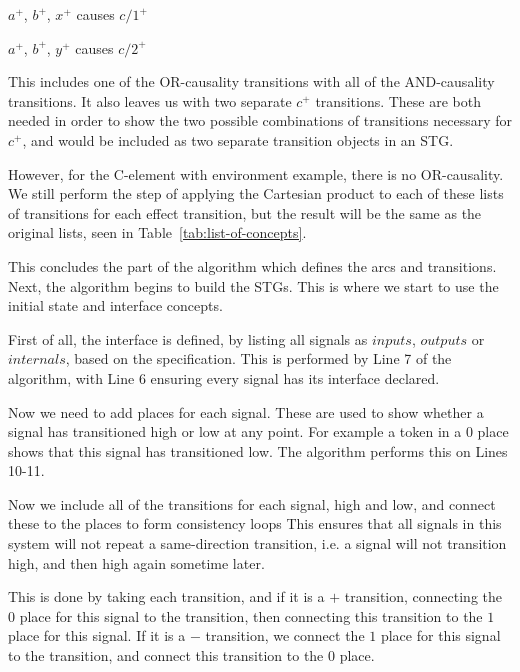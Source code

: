 \documentclass[british,conference,compsoc]{IEEEtran}
\begin{document}
\vspace{-2mm}

\begin{center}

$a^{+}$, $b^{+}$, $x^{+}$ causes $c/1^{+}$

$a^{+}$, $b^{+}$, $y^{+}$ causes $c/2^{+}$

\end{center}

\vspace{-2mm}

\noindent This includes one of the OR-causality transitions with all of the 
AND-causality transitions. It also leaves us with two separate $c^{+}$ 
transitions. These are both needed in order to show the two possible 
combinations of transitions necessary for $c^{+}$, and would be included as two
separate transition objects in an STG. 

However, for the C-element with environment example, there is no OR-causality. 
We still perform the step of applying the Cartesian product to each of these 
lists of transitions for each effect transition, but the result will be the 
same as the original lists, seen in Table~\ref{tab:list-of-concepts}.

This concludes the part of the algorithm which defines the arcs
and transitions. Next, the algorithm begins to build the STGs. This is where
we start to use the initial state and interface concepts. 

First of all, the interface is defined, by listing all signals as 
$inputs$, $outputs$ or $internals$, based on the specification. This
is performed by Line 7 of the algorithm, with Line 6 ensuring every
signal has its interface declared. 

Now we need to add places for each signal. These are used to
show whether a signal has transitioned high or low at any point. 
For example a token in a $0$ place shows that this signal has 
transitioned low. The algorithm performs this on Lines 10-11.  

Now we include all of the 
transitions for each signal, high and low, and connect these to the places to form consistency loops
This ensures that all signals in this system will not repeat a same-direction transition, i.e. a signal will
not transition high, and then high again sometime later.

This is done by taking each transition, and if it is a $+$ transition, 
connecting the $0$ place for this signal to the transition, then connecting 
this transition to the $1$ place for this signal. If it is a $-$ 
transition, we connect the $1$ place for this signal to the transition, and 
connect this transition to the $0$ place.
\end{document}
